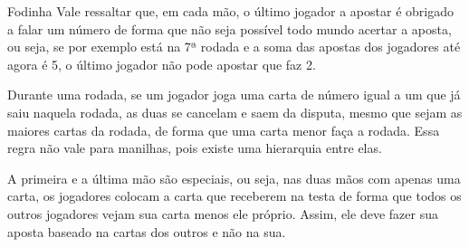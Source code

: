 \begin{subsecao}{Fodinha}
Vale ressaltar que, em cada mão, o último jogador a apostar é obrigado a falar
um número de forma que não seja possível todo mundo acertar a aposta, ou seja,
se por exemplo está na 7ª rodada e a soma das apostas dos jogadores até agora
é 5, o último jogador não pode apostar que faz 2.

Durante uma rodada, se um jogador joga uma carta de número igual a um que já
saiu naquela rodada, as duas se cancelam e saem da disputa, mesmo que sejam as
maiores cartas da rodada, de forma que uma carta menor faça a rodada. Essa
regra não vale para manilhas, pois existe uma hierarquia entre elas.

A primeira e a última mão são especiais, ou seja, nas duas mãos com apenas
uma carta, os jogadores colocam a carta que receberem na testa de forma que
todos os outros jogadores vejam sua carta menos ele próprio. Assim, ele deve
fazer sua aposta baseado na cartas dos outros e não na sua.

\end{subsecao}

